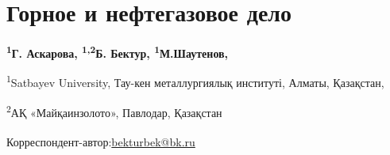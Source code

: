 \newpage
\let\cleardoublepage\clearpage
\chapter{Горное и нефтегазовое дело}

\begin{articleheader}

{\bfseries \textsuperscript{1}Г. Аскарова, \textsuperscript{1,2}Б.
Бектур\textsuperscript{\envelope }, \textsuperscript{1}М.Шаутенов,
}
\end{articleheader}
\begin{affiliation}

\textsuperscript{1}Satbayev University, Тау-кен металлургиялық
институті, Алматы, Қазақстан,

\textsuperscript{2}АҚ «Майқаинзолото», Павлодар, Қазақстан

\raggedright{\bfseries \textsuperscript{\envelope }}Корреспондент-автор:\href{mailto:bekturbek@bk.run}{bekturbek@bk.ru}
\end{affiliation}

